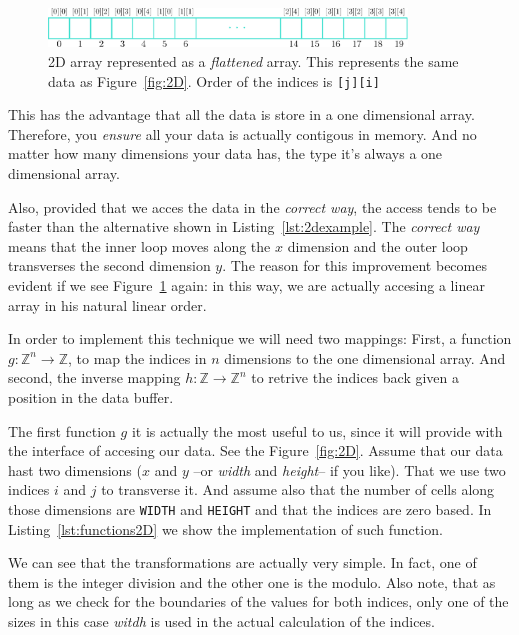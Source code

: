 \begin{figure}[htb]
  \centering
  \includegraphics[width=0.85\textwidth]{img/arrayFlat}
  \caption{2D array represented as a \emph{flattened} array. This represents the same data as Figure~\ref{fig:2D}. Order of the indices is \texttt{[j][i]}}
  \label{fig:Flat}
\end{figure}

This has the advantage that all the data is store in a one dimensional array.
Therefore, you \emph{ensure} all your data is actually contigous in memory.
And no matter how many dimensions your data has, the type it's always a one dimensional array.

Also, provided that we acces the data in the \emph{correct way}, the access tends to be faster than the alternative shown in Listing~\ref{lst:2dexample}.
The \emph{correct way} means that the inner loop moves along the $x$ dimension and the outer loop transverses the second dimension $y$.
The reason for this improvement becomes evident if we see Figure~\ref{fig:Flat} again: in this way, we are actually accesing a linear array in his natural linear order.

In order to implement this technique we will need two mappings:
First, a function $g:\mathbb{Z}^n \rightarrow \mathbb{Z}$, to map the indices in $n$ dimensions to the one dimensional array.
And second, the inverse mapping $h:\mathbb{Z} \rightarrow \mathbb{Z}^n$ to retrive the indices back given a position in the data buffer.

The first function $g$ it is actually the most useful to us, since it will provide with the interface of accesing our data.
See the Figure~\ref{fig:2D}.
Assume that our data hast two dimensions ($x$ and $y$ --or \emph{width} and \emph{height}-- if you like).
That we use two indices $i$ and $j$ to transverse it.
And assume also that the number of cells along those dimensions are \texttt{WIDTH} and \texttt{HEIGHT} and that the indices are zero based.
In Listing~\ref{lst:functions2D} we show the implementation of such function.

We can see that the transformations are actually very simple.
In fact, one of them is the integer division and the other one is the modulo.
Also note, that as long as we check for the boundaries of the values for both indices, only one of the sizes in this case \emph{witdh} is used in the actual calculation of the indices.

